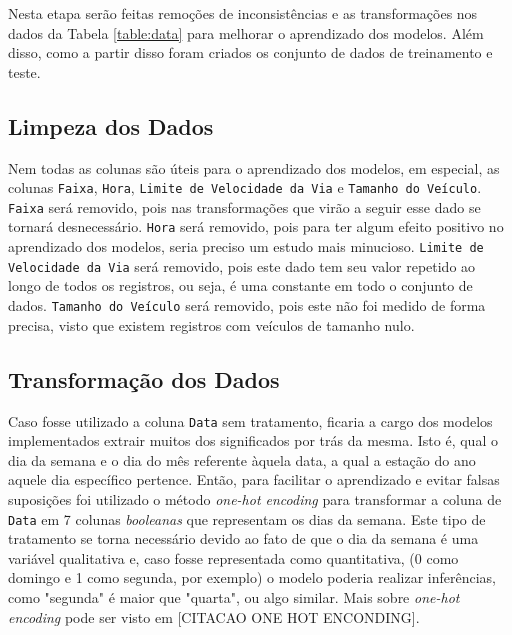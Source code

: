 Nesta etapa serão feitas remoções de inconsistências e as transformações nos dados da Tabela \ref{table:data} para melhorar o aprendizado dos modelos. Além disso, como a partir disso foram criados os conjunto de dados de treinamento e teste.

\subsection{Limpeza dos Dados}

Nem todas as colunas são úteis para o aprendizado dos modelos, em especial, as colunas \texttt{Faixa}, \texttt{Hora}, \texttt{Limite de Velocidade da Via} e \texttt{Tamanho do Veículo}. \texttt{Faixa} será removido, pois nas transformações que virão a seguir esse dado se tornará desnecessário. \texttt{Hora} será removido, pois para ter algum efeito positivo no aprendizado dos modelos, seria preciso um estudo mais minucioso. \texttt{Limite de Velocidade da Via} será removido, pois este dado tem seu valor repetido ao longo de todos os registros, ou seja, é uma constante em todo o conjunto de dados. \texttt{Tamanho do Veículo} será removido, pois este não foi medido de forma precisa, visto que existem registros com veículos de tamanho nulo.


\subsection{Transformação dos Dados}



Caso fosse utilizado a coluna \texttt{Data} sem tratamento, ficaria a cargo dos modelos implementados extrair muitos dos significados por trás da mesma. Isto é, qual o dia da semana e o dia do mês referente àquela data, a qual a estação do ano aquele dia específico pertence. Então, para facilitar o aprendizado e evitar falsas suposições foi utilizado o método \textit{one-hot encoding} para transformar a coluna de \texttt{Data} em 7 colunas \textit{booleanas} que representam os dias da semana. Este tipo de tratamento se torna necessário devido ao fato de que o dia da semana é uma variável qualitativa e, caso fosse representada como quantitativa, (0 como domingo e 1 como segunda, por exemplo) o modelo poderia realizar inferências, como "segunda" é maior que "quarta", ou algo similar. Mais sobre \textit{one-hot encoding} pode ser visto em [CITACAO ONE HOT ENCONDING].

